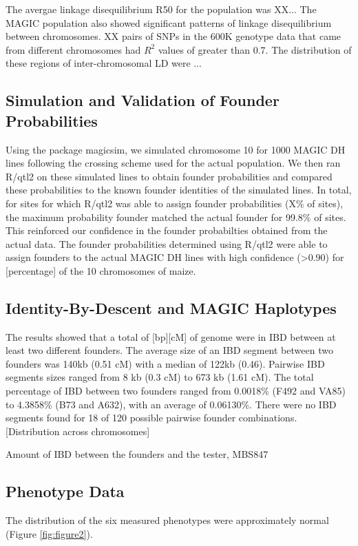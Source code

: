 \documentclass[article,9pt,twocolumn,twoside]{rilabRxiv}
\begin{document}
The avergae linkage disequilibrium R50 for the population was XX...
The MAGIC population also showed significant patterns of linkage disequilibrium between chromosomes. XX pairs of SNPs in the 600K genotype data that came from different chromosomes had $R^2$ values of greater than 0.7. The distribution of these regions of inter-chromosomal LD were ...

\subsection{Simulation and Validation of Founder Probabilities}
Using the package magicsim, we simulated chromosome 10 for 1000 MAGIC DH lines following the crossing scheme used for the actual population. We then ran R/qtl2 on these simulated lines to obtain founder probabilities and compared these probabilities to the known founder identities of the simulated lines. In total, for sites for which R/qtl2 was able to assign founder probabilities (X\% of sites), the maximum probability founder matched the actual founder for 99.8\% of sites. This reinforced our confidence in the founder probabilties obtained from the actual data.
The founder probabilities determined using R/qtl2 were able to assign founders to the actual MAGIC DH lines with high confidence (>0.90) for [percentage] of the 10 chromosomes of maize.

\subsection{Identity-By-Descent and MAGIC Haplotypes}
The results showed that a total of [bp][cM] of genome were in IBD between at
least two different founders. The average size of an IBD segment between two founders was 140kb (0.51 cM) with a median of 122kb (0.46). Pairwise IBD segments sizes ranged from 8 kb (0.3 cM) to  673 kb (1.61 cM). The total percentage of IBD between two founders ranged from 0.0018\% (F492 and VA85) to 4.3858\% (B73 and A632), with an average of 0.06130\%. There were no IBD segments found for 18 of 120 possible pairwise founder combinations.  [Distribution across chromosomes]

Amount of IBD between the founders and the tester, MBS847


\subsection{Phenotype Data}
The distribution of the six measured phenotypes were approximately normal (Figure \ref{fig:figure2}).
\end{document}
